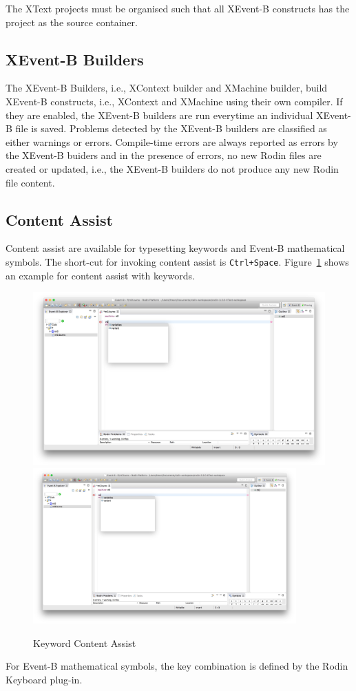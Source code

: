 The XText projects must be organised such that all XEvent-B constructs has the project as the source container.

\subsection{XEvent-B Builders}
\label{sec:xevent-b-builders}
The XEvent-B Builders, i.e., XContext builder and XMachine builder, build XEvent-B constructs, i.e., XContext and XMachine using their own compiler.  If they are enabled, the XEvent-B builders are run everytime an individual XEvent-B file is saved.  Problems detected by the XEvent-B builders are classified as either warnings or errors.  Compile-time errors are always reported as errors by the XEvent-B buiders and in the presence of errors, no new Rodin files are created or updated, i.e., the XEvent-B builders do not produce any new Rodin file content.

\subsection{Content Assist}
\label{sec:content-assist}
Content assist are available for typesetting keywords and Event-B mathematical symbols. The short-cut for invoking content assist is \texttt{Ctrl+Space}.  Figure~\ref{fig:KeywordContentAssist} shows an example for content assist with keywords.
\begin{figure}[!htbp]
  \centering
  \ifplastex
  \includegraphics[width=512]{figures/KeywordContentAssist}
  \else
  \includegraphics[width=0.9\textwidth]{figures/KeywordContentAssist}
  \fi
  \caption{Keyword Content Assist}
  \label{fig:KeywordContentAssist}
\end{figure}
For Event-B mathematical symbols, the key combination is defined by the Rodin Keyboard plug-in.


